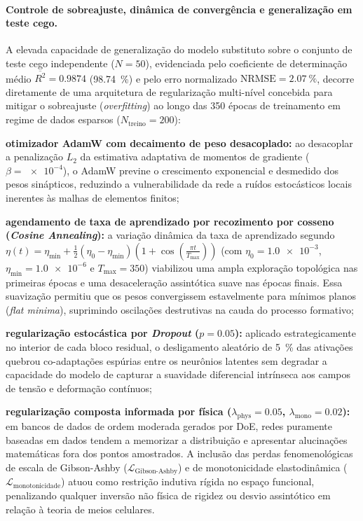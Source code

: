 \paragraph*{Controle de sobreajuste, dinâmica de convergência e generalização em teste cego.}
A elevada capacidade de generalização do modelo substituto sobre o conjunto de teste cego independente ($N = 50$), evidenciada pelo coeficiente de determinação médio $\overline{R^2} = \num{0.9874}$ (\SI{98.74}{\percent}) e pelo erro normalizado $\text{NRMSE} = \SI{2.07}{\percent}$, decorre diretamente de uma arquitetura de regularização multi-nível concebida para mitigar o sobreajuste (\textit{overfitting}) ao longo das 350 épocas de treinamento em regime de dados esparsos ($N_{\text{treino}} = 200$):
\begin{alineas}
  \item \textbf{otimizador AdamW com decaimento de peso desacoplado:} ao desacoplar a penalização $L_2$ da estimativa adaptativa de momentos de gradiente ($\beta = \num{e-4}$), o AdamW previne o crescimento exponencial e desmedido dos pesos sinápticos, reduzindo a vulnerabilidade da rede a ruídos estocásticos locais inerentes às malhas de elementos finitos;
  \item \textbf{agendamento de taxa de aprendizado por recozimento por cosseno (\textit{Cosine Annealing}):} a variação dinâmica da taxa de aprendizado segundo $\eta(t) = \eta_{\min} + \frac{1}{2}(\eta_0 - \eta_{\min})\left(1 + \cos\left(\frac{\pi t}{T_{\max}}\right)\right)$ (com $\eta_0 = \num{1.0e-3}$, $\eta_{\min} = \num{1.0e-6}$ e $T_{\max} = 350$) viabilizou uma ampla exploração topológica nas primeiras épocas e uma desaceleração assintótica suave nas épocas finais. Essa suavização permitiu que os pesos convergissem estavelmente para mínimos planos (\textit{flat minima}), suprimindo oscilações destrutivas na cauda do processo formativo;
  \item \textbf{regularização estocástica por \textit{Dropout} ($p = \num{0.05}$):} aplicado estrategicamente no interior de cada bloco residual, o desligamento aleatório de \SI{5}{\percent} das ativações quebrou co-adaptações espúrias entre os neurônios latentes sem degradar a capacidade do modelo de capturar a suavidade diferencial intrínseca aos campos de tensão e deformação contínuos;
  \item \textbf{regularização composta informada por física ($\lambda_{\text{phys}} = \num{0.05}$, $\lambda_{\text{mono}} = \num{0.02}$):} em bancos de dados de ordem moderada gerados por DoE, redes puramente baseadas em dados tendem a memorizar a distribuição e apresentar alucinações matemáticas fora dos pontos amostrados. A inclusão das perdas fenomenológicas de escala de Gibson-Ashby ($\mathcal{L}_{\text{Gibson-Ashby}}$) e de monotonicidade elastodinâmica ($\mathcal{L}_{\text{monotonicidade}}$) atuou como restrição indutiva rígida no espaço funcional, penalizando qualquer inversão não física de rigidez ou desvio assintótico em relação à teoria de meios celulares.
\end{alineas}
